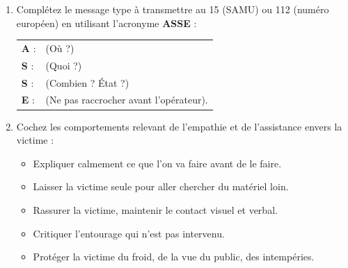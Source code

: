 \documentclass[11pt]{article}
\begin{document}
\begin{exercice}
\begin{enumerate}
    \item Complétez le message type à transmettre au 15 (SAMU) ou 112 (numéro européen) en utilisant l'acronyme \textbf{ASSE} :
    \begin{tabular}{ll}
        \textbf{A} : & \underline{\hspace{6cm}} (Où ?) \\
        \textbf{S} : & \underline{\hspace{6cm}} (Quoi ?) \\
        \textbf{S} : & \underline{\hspace{6cm}} (Combien ? État ?) \\
        \textbf{E} : & \underline{\hspace{6cm}} (Ne pas raccrocher avant l'opérateur).
    \end{tabular}
    \item Cochez les comportements relevant de l'empathie et de l'assistance envers la victime :
    \begin{itemize}
        \item[] Expliquer calmement ce que l'on va faire avant de le faire.
        \item[] Laisser la victime seule pour aller chercher du matériel loin.
        \item[] Rassurer la victime, maintenir le contact visuel et verbal.
        \item[] Critiquer l'entourage qui n'est pas intervenu.
        \item[] Protéger la victime du froid, de la vue du public, des intempéries.
    \end{itemize}
\end{enumerate}
\end{exercice}
\end{document}

